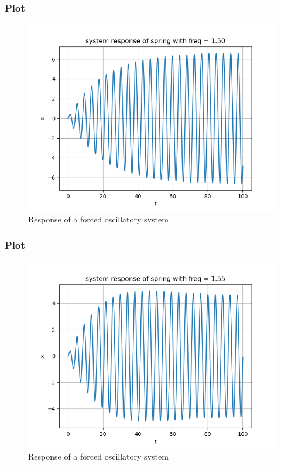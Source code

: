 \documentclass[11pt]{article}
\begin{document}
\subsubsection{Plot}
\begin{figure}[H]
    \centering
    \includegraphics[scale = 1]{Figure_5.png}
    \caption{Response of a forced oscillatory system}
\end{figure}

\subsubsection{Plot}
\begin{figure}[H]
    \centering
    \includegraphics[scale = 1]{Figure_6.png}
    \caption{Response of a forced oscillatory system}
\end{figure}
\end{document}
